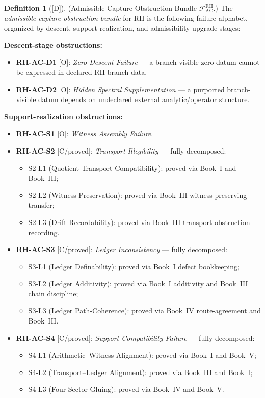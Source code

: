 \documentclass[12pt,oneside]{amsbook}
\theoremstyle{plain}
\theoremstyle{definition}
\newtheorem{definition}[theorem]{Definition}
\theoremstyle{remark}
\newcommand{\status}[1]{\textup{[#1]}}
\begin{document}
\begin{definition}[\status{D}]\label{def:rh-ac-ledger}
\textup{(Admissible-Capture Obstruction Bundle $\mathcal{F}^{\mathrm{RH}}_{\mathrm{AC}}$.)}
The \emph{admissible-capture obstruction bundle} for RH is the
following failure alphabet, organized by descent, support-realization,
and admissibility-upgrade stages:

\medskip
\noindent\textbf{Descent-stage obstructions:}
\begin{itemize}
 \item \textbf{RH-AC-D1} [O]: \emph{Zero Descent Failure} ---
 a branch-visible zero datum cannot be expressed in declared
 RH branch data.
 \item \textbf{RH-AC-D2} [O]: \emph{Hidden Spectral Supplementation}
 --- a purported branch-visible datum depends on undeclared
 external analytic/operator structure.
\end{itemize}

\medskip
\noindent\textbf{Support-realization obstructions:}
\begin{itemize}
 \item \textbf{RH-AC-S1} [O]: \emph{Witness Assembly Failure}.
 \item \textbf{RH-AC-S2} [C/proved]: \emph{Transport Illegibility} ---
 fully decomposed:
 \begin{itemize}
 \item S2-L1 (Quotient-Transport Compatibility): proved via
 Book~I and Book~III;
 \item S2-L2 (Witness Preservation): proved via Book~III
 witness-preserving transfer;
 \item S2-L3 (Drift Recordability): proved via Book~III
 transport obstruction recording.
 \end{itemize}
 \item \textbf{RH-AC-S3} [C/proved]: \emph{Ledger Inconsistency} ---
 fully decomposed:
 \begin{itemize}
 \item S3-L1 (Ledger Definability): proved via Book~I
 defect bookkeeping;
 \item S3-L2 (Ledger Additivity): proved via Book~I
 additivity and Book~III chain discipline;
 \item S3-L3 (Ledger Path-Coherence): proved via Book~IV
 route-agreement and Book~III.
 \end{itemize}
 \item \textbf{RH-AC-S4} [C/proved]: \emph{Support Compatibility
 Failure} --- fully decomposed:
 \begin{itemize}
 \item S4-L1 (Arithmetic--Witness Alignment): proved via
 Book~I and Book~V;
 \item S4-L2 (Transport--Ledger Alignment): proved via
 Book~III and Book~I;
 \item S4-L3 (Four-Sector Gluing): proved via Book~IV
 and Book~V.
 \end{itemize}
\end{itemize}


\end{definition}
\end{document}
